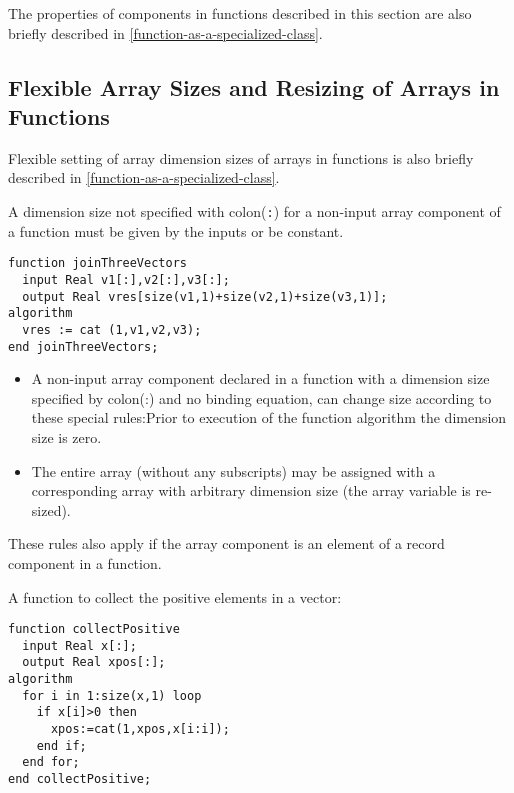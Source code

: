 \begin{nonnormative}
The properties of components in functions described in this
section are also briefly described in \cref{function-as-a-specialized-class}.
\end{nonnormative}

\subsection{Flexible Array Sizes and Resizing of Arrays in Functions}\label{flexible-array-sizes-and-resizing-of-arrays-in-functions}

\begin{nonnormative}
Flexible setting of array dimension sizes of arrays in
functions is also briefly described in \cref{function-as-a-specialized-class}.
\end{nonnormative}

A dimension size not specified with colon(\lstinline!:!) for a non-input array
component of a function must be given by the inputs or be constant.

\begin{example}
\begin{lstlisting}[language=modelica]
function joinThreeVectors
  input Real v1[:],v2[:],v3[:];
  output Real vres[size(v1,1)+size(v2,1)+size(v3,1)];
algorithm
  vres := cat (1,v1,v2,v3);
end joinThreeVectors;
\end{lstlisting}
\end{example}

\begin{itemize}
\item
  A non-input array component declared in a function with a dimension
  size specified by colon(:) and no binding equation, can change
  size according to these special rules:Prior to execution of the
  function algorithm the dimension size is zero.
\item
  The entire array (without any subscripts) may be assigned with a
  corresponding array with arbitrary dimension size (the array variable
  is re-sized).
\end{itemize}

These rules also apply if the array component is an element of a record
component in a function.

\begin{example}
A function to collect the positive elements in a vector:
\begin{lstlisting}[language=modelica]
function collectPositive
  input Real x[:];
  output Real xpos[:];
algorithm
  for i in 1:size(x,1) loop
    if x[i]>0 then
      xpos:=cat(1,xpos,x[i:i]);
    end if;
  end for;
end collectPositive;
\end{lstlisting}
\end{example}

